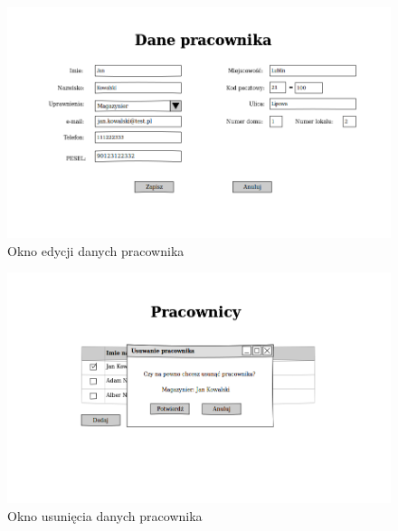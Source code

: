 \begin{figure}[!htb]
  \begin{center}
    \includegraphics[scale=0.45]{../img/interfejs/edycja-pracownika.png}
  \end{center}
  \caption{Okno edycji danych pracownika}
\end{figure}
\FloatBarrier

\begin{figure}[!htb]
  \begin{center}
    \includegraphics[scale=0.45]{../img/interfejs/usuniecie-pracownika.png}
  \end{center}
  \caption{Okno usunięcia danych pracownika}
\end{figure}
\FloatBarrier

